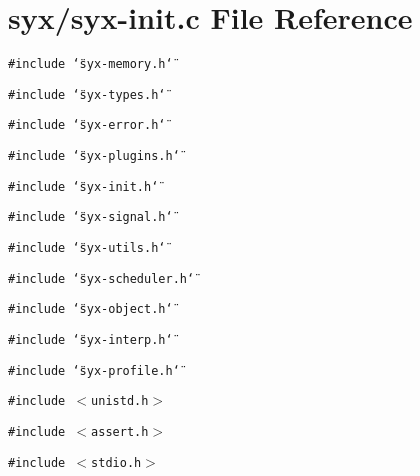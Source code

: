 \hypertarget{syx-init_8c}{
\section{syx/syx-init.c File Reference}
\label{syx-init_8c}
}
{\tt \#include \char`\"{}syx-memory.h\char`\"{}}\par
{\tt \#include \char`\"{}syx-types.h\char`\"{}}\par
{\tt \#include \char`\"{}syx-error.h\char`\"{}}\par
{\tt \#include \char`\"{}syx-plugins.h\char`\"{}}\par
{\tt \#include \char`\"{}syx-init.h\char`\"{}}\par
{\tt \#include \char`\"{}syx-signal.h\char`\"{}}\par
{\tt \#include \char`\"{}syx-utils.h\char`\"{}}\par
{\tt \#include \char`\"{}syx-scheduler.h\char`\"{}}\par
{\tt \#include \char`\"{}syx-object.h\char`\"{}}\par
{\tt \#include \char`\"{}syx-interp.h\char`\"{}}\par
{\tt \#include \char`\"{}syx-profile.h\char`\"{}}\par
{\tt \#include $<$unistd.h$>$}\par
{\tt \#include $<$assert.h$>$}\par
{\tt \#include $<$stdio.h$>$}\par
